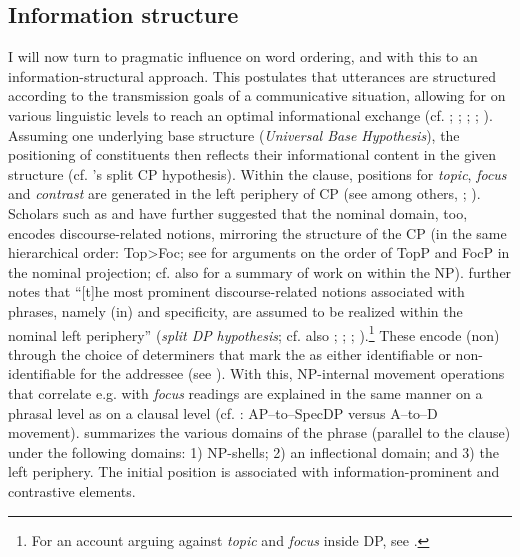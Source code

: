\documentclass[output=paper,colorlinks,citecolor=brown]{langscibook}
\begin{document}
\subsection{Information structure}\label{ch8s3.3}
I will now turn to pragmatic influence on word ordering, and with this
to an information-structural approach. This postulates that utterances
are structured according to the transmission goals of a communicative
situation, allowing for  on various linguistic levels to reach
an optimal informational exchange (cf. \citealp{Halliday1967}; \citealp{chafe1976givenness}; \citealp{Lambrecht1994}; \citealp{Büring2005}; \citealp{Caruso2016}). Assuming one underlying base
structure (\emph{Universal Base Hypothesis}), the positioning of
constituents then reflects their informational content in the given
structure (cf. \citeauthor{Rizzi1997}'s \citeyear{Rizzi1997} split CP hypothesis). Within the clause,
positions for \emph{topic}, \emph{focus} and \emph{contrast} are
generated in the left periphery of CP (see among others, \citealp{Petrova2009}; \citealp{Hróarsdóttir2009}). Scholars such as \citet{Giusti1996} and \citet{IsacKirk2008} have further suggested that the nominal domain, too, encodes
discourse-related notions, mirroring the structure of the CP (in the
same hierarchical order: Top\textgreater Foc; see \citealp[31]{Caruso2016} for
arguments on the order of TopP and FocP in the nominal projection; cf.
also \citealp{AbohCorverDyakonovaKoppen2010} for a summary of work on 
within the NP). \citet[5]{Caruso2015} further notes that ``{[}t{]}he most
prominent discourse-related notions associated with  phrases,
namely (in) and specificity, are assumed to be realized
within the nominal left periphery'' (\emph{split
DP} \emph{hypothesis}; cf. also \citealp{IhsanePuskás2001}; \citealp{Laenzlinger2005}; \citealp{Giusti2005,Giusti2012}; \citealp{Haegeman2004}).\footnote{For an account arguing against \emph{topic}
  and \emph{focus} inside DP, see \cite{Szendröi2010}.} These encode
(non) through the choice of determiners that mark the  as
either identifiable or non-identifiable for the addressee (see \citealp[783]{AbohCorverDyakonovaKoppen2010}). With this, NP-internal movement operations that
correlate e.g. with \emph{focus} readings are explained in the same
manner on a phrasal level as on a clausal level (cf. \citealp{Giusti2006}:
AP--to--SpecDP versus A--to--D movement). \citet[28]{Caruso2016} summarizes
the various domains of the  phrase (parallel to the clause) under
the following domains: 1) NP-shells; 2) an inflectional domain; and 3)
the left periphery. The initial position is associated with
information-prominent and contrastive elements.
\end{document}
